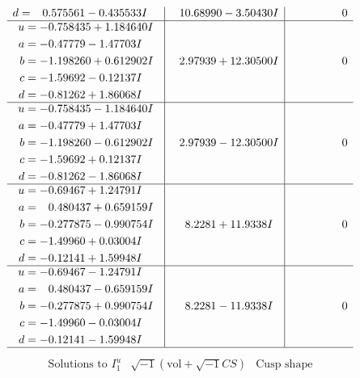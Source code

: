 \documentclass[1p]{elsarticle_modified}
\theoremstyle{definition}
\newcommand{\I}{\sqrt{-1}}
\begin{document}
$$\begin{array}{c|c|c}
\begin{aligned}
d &= \phantom{-}0.575561 - 0.435533 I\end{aligned}
 & \phantom{-}10.68990 - 3.50430 I & \phantom{-0.000000 } 0 \\ \hline\begin{aligned}
u &= -0.758435 + 1.184640 I \\
a &= -0.47779 - 1.47703 I \\
b &= -1.198260 + 0.612902 I \\
c &= -1.59692 - 0.12137 I \\
d &= -0.81262 + 1.86068 I\end{aligned}
 & \phantom{-}2.97939 + 12.30500 I & \phantom{-0.000000 } 0 \\ \hline\begin{aligned}
u &= -0.758435 - 1.184640 I \\
a &= -0.47779 + 1.47703 I \\
b &= -1.198260 - 0.612902 I \\
c &= -1.59692 + 0.12137 I \\
d &= -0.81262 - 1.86068 I\end{aligned}
 & \phantom{-}2.97939 - 12.30500 I & \phantom{-0.000000 } 0 \\ \hline\begin{aligned}
u &= -0.69467 + 1.24791 I \\
a &= \phantom{-}0.480437 + 0.659159 I \\
b &= -0.277875 - 0.990754 I \\
c &= -1.49960 + 0.03004 I \\
d &= -0.12141 + 1.59948 I\end{aligned}
 & \phantom{-}8.2281 + 11.9338 I & \phantom{-0.000000 } 0 \\ \hline\begin{aligned}
u &= -0.69467 - 1.24791 I \\
a &= \phantom{-}0.480437 - 0.659159 I \\
b &= -0.277875 + 0.990754 I \\
c &= -1.49960 - 0.03004 I \\
d &= -0.12141 - 1.59948 I\end{aligned}
 & \phantom{-}8.2281 - 11.9338 I & \phantom{-0.000000 } 0\\
 \hline 
 \end{array}$$\newpage$$\begin{array}{c|c|c}  
\text{Solutions to }I^u_{1}& \I (\text{vol} + \sqrt{-1}CS) & \text{Cusp shape}\\
 \hline 
\begin{aligned}

\end{aligned}
\end{array}$$
\end{document}
